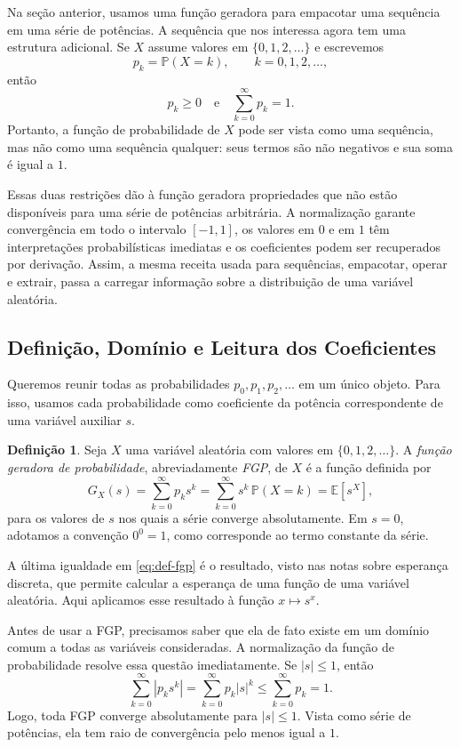\documentclass[12pt,portuguese]{article}
\theoremstyle{definition}
\newtheorem{definition}[definition]{Definição}
\theoremstyle{plainexercise}
\theoremstyle{starredexercise}
\theoremstyle{definition}
\begin{document}
Na seção anterior, usamos uma função geradora para empacotar uma sequência
em uma série de potências. A sequência que nos interessa agora tem uma
estrutura adicional. Se $X$ assume valores em
$\{0,1,2,\ldots\}$ e escrevemos
\[
p_k=\mathbb{P}(X=k),\qquad k=0,1,2,\ldots,
\]
então
\[
p_k\geqslant 0
\quad\text{e}\quad
\sum_{k=0}^{\infty}p_k=1.
\]
Portanto, a função de probabilidade de $X$ pode ser vista como uma sequência,
mas não como uma sequência qualquer: seus termos são não negativos e sua
soma é igual a $1$.

Essas duas restrições dão à função geradora propriedades que não estão
disponíveis para uma série de potências arbitrária. A normalização garante
convergência em todo o intervalo $[-1,1]$, os valores em $0$ e em $1$ têm
interpretações probabilísticas imediatas e os coeficientes podem ser
recuperados por derivação. Assim, a mesma receita usada para sequências,
empacotar, operar e extrair, passa a carregar informação sobre a distribuição
de uma variável aleatória.

\subsection{Definição, Domínio e Leitura dos Coeficientes}
\label{sec:fgp-definicao}

Queremos reunir todas as probabilidades $p_0,p_1,p_2,\ldots$ em um único objeto.
Para isso, usamos cada probabilidade como coeficiente da potência
correspondente de uma variável auxiliar $s$.

\begin{definition}\label{def:funcao-geradora-probabilidade}
Seja $X$ uma variável aleatória com valores em $\{0,1,2,\ldots\}$.
A \emph{função geradora de probabilidade}, abreviadamente \emph{FGP}, de $X$
é a função definida por
\begin{equation}
\label{eq:def-fgp}
G_X(s)
=\sum_{k=0}^{\infty}p_k s^k
=\sum_{k=0}^{\infty}s^k\,\mathbb{P}(X=k)
=\mathbb{E}[s^X],
\end{equation}
para os valores de $s$ nos quais a série converge absolutamente.
Em $s=0$, adotamos a convenção $0^0=1$, como corresponde ao termo constante
da série.
\end{definition}

A última igualdade em \eqref{eq:def-fgp} é o resultado, visto nas notas sobre
esperança discreta, que permite calcular a esperança de uma função de uma
variável aleatória. Aqui aplicamos esse resultado à função $x\mapsto s^x$.

Antes de usar a FGP, precisamos saber que ela de fato existe em um domínio
comum a todas as variáveis consideradas. A normalização da função de
probabilidade resolve essa questão imediatamente. Se $|s|\leqslant 1$, então
\[
\sum_{k=0}^{\infty}|p_k s^k|
=\sum_{k=0}^{\infty}p_k|s|^k
\leqslant
\sum_{k=0}^{\infty}p_k
=1.
\]
Logo, toda FGP converge absolutamente para $|s|\leqslant 1$. Vista como série
de potências, ela tem raio de convergência pelo menos igual a $1$.
\end{document}
